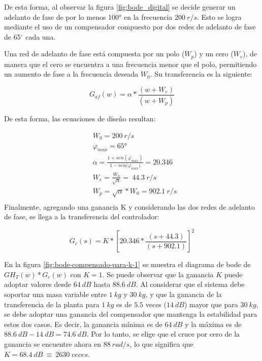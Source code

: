 De esta forma, al observar la figura \ref{fig:bode_digital} se decide generar un adelanto de fase de por lo menos 100° en la frecuencia $200\:r/s$. Esto se logra mediante el uso de un compensador compuesto por dos redes de adelanto de fase de 65$\mathrm{{}^\circ}$ cada una. 

Una red de adelanto de fase está compuesta por un polo ($W_p$) y un cero ($W_c$), de manera que el cero se encuentra a una frecuencia menor que el polo, permitiendo un aumento de fase a la frecuencia deseada $W_0$. Su transferencia es la siguiente:

\begin{equation} \label{eq_tf_adelanto_dig}
	G_{af}(w)=\alpha*\frac{(w + W_c)}{(w + W_p)}
\end{equation}

\noindent De esta forma, las ecuaciones de diseño resultan:

\begin{equation*}
	\begin{aligned}
		&W_0 =200\:r/s\\
		&{\varphi }_{max} =65\textrm{°}\\
		&\alpha =\frac{1+sen({\varphi }_{max})}{1-sen{(\varphi }_{max})}=20.346\\
		&W_c =\frac{W_0}{\sqrt{\alpha }}=\ 44.3\:r/s\\
		&W_p =\sqrt{\alpha }*W_0=902.1\: r/s\\
	\end{aligned}
\end{equation*} 
\noindent Finalmente, agregando una ganancia K y considerando las dos redes de adelanto de fase, se llega a la transferencia del controlador:

\begin{equation}  
	G_c(s)=K*{[20.346*\frac{(s+44.3)}{(s+902.1)}]}^2
	\label{eq:transferencia-del-compensador_dig}
\end{equation} 

En la figura \ref{fig:bode-compensado-para-k-1} se muestra el diagrama de bode de ${GH}_T(w)*G_c(w)$ con $K=1$. Se puede observar que la ganancia $K$ puede adoptar valores desde $64\:dB$ hasta $88.6\:dB$. Al considerar que el sistema debe soportar una masa variable entre $1\:kg$ y $30\:kg$, y que la ganancia de la transferencia de la planta para $1\:kg$ es de $5.5$ veces ($14\:dB$) mayor que para $30\:kg$, se debe adoptar una ganancia del compensador que mantenga la estabilidad para estos dos casos. Es decir, la ganancia m\'{i}nima es de $64\:dB$ y la m\'{a}xima es de $88.6\:dB - 14\:dB = 74.6\:dB$. Por lo tanto, se elige que el cruce por cero de la ganancia se encuentre ahora en $88\:rad/s$, lo que significa que $K=68.4\:dB\ \equiv \ 2630\:veces$.

